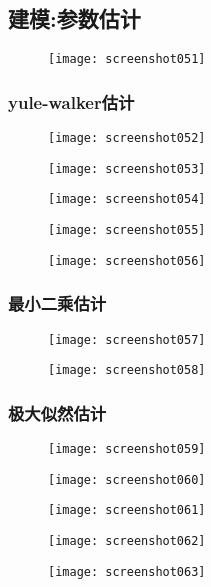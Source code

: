 \documentclass[11pt,a4paper,oneside]{book}
\begin{document}
\subsection{建模:参数估计}
\begin{figure}[H]
	\texttt{[image: screenshot051]}
	\label{fig:screenshot051}
\end{figure}

\subsubsection{yule-walker估计}
\begin{figure}[H]
	\texttt{[image: screenshot052]}
	\label{fig:screenshot052}
\end{figure}
\begin{figure}[H]
	\centering
	\texttt{[image: screenshot053]}
	\label{fig:screenshot053}
\end{figure}
\begin{figure}[H]
	\texttt{[image: screenshot054]}
	\label{fig:screenshot054}
\end{figure}
\begin{figure}[H]
	\texttt{[image: screenshot055]}
	\label{fig:screenshot055}
\end{figure}
\begin{figure}[H]
	\texttt{[image: screenshot056]}
	\label{fig:screenshot056}
\end{figure}

\subsubsection{最小二乘估计}
\begin{figure}[H]
	\texttt{[image: screenshot057]}
	\label{fig:screenshot057}
\end{figure}
\begin{figure}[H]
	\texttt{[image: screenshot058]}
	\label{fig:screenshot058}
\end{figure}

\subsubsection{极大似然估计}
\begin{figure}[H]
	\texttt{[image: screenshot059]}
	\label{fig:screenshot059}
\end{figure}
\begin{figure}[H]
	\texttt{[image: screenshot060]}
	\label{fig:screenshot060}
\end{figure}
\begin{figure}[H]
	\texttt{[image: screenshot061]}
	\label{fig:screenshot061}
\end{figure}
\begin{figure}[H]
	\texttt{[image: screenshot062]}
	\label{fig:screenshot062}
\end{figure}
\begin{figure}[H]
	\texttt{[image: screenshot063]}
	\label{fig:screenshot063}
\end{figure}
\end{document}

